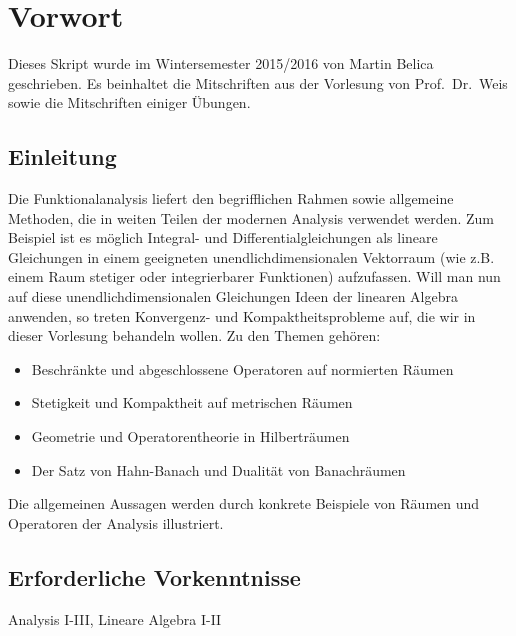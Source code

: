 
\chapter*{Vorwort}
Dieses Skript wurde im Wintersemester 2015/2016
von Martin Belica geschrieben. Es beinhaltet die Mitschriften aus
der Vorlesung von Prof.~Dr.~Weis sowie die Mitschriften einiger
Übungen.

\thispagestyle{empty}

\section*{Einleitung}

Die Funktionalanalysis liefert den begrifflichen Rahmen sowie allgemeine Methoden, die in weiten Teilen der modernen Analysis verwendet werden. Zum Beispiel ist es möglich Integral- und Differentialgleichungen als lineare Gleichungen in einem geeigneten unendlichdimensionalen Vektorraum (wie z.B. einem Raum stetiger oder integrierbarer Funktionen) aufzufassen. Will man nun auf diese unendlichdimensionalen Gleichungen Ideen der linearen Algebra anwenden, so treten Konvergenz- und Kompaktheitsprobleme auf, die wir in dieser Vorlesung behandeln wollen. Zu den Themen gehören:

  \begin{itemize}
     \item Beschränkte und abgeschlossene Operatoren auf normierten Räumen
     \item Stetigkeit und Kompaktheit auf metrischen Räumen
     \item Geometrie und Operatorentheorie in Hilberträumen
     \item Der Satz von Hahn-Banach und Dualität von Banachräumen    
  \end{itemize}
  
Die allgemeinen Aussagen werden durch konkrete Beispiele von Räumen und Operatoren der Analysis illustriert.

\section*{Erforderliche Vorkenntnisse}
Analysis I-III, Lineare Algebra I-II


\begin{center}	

\end{center}